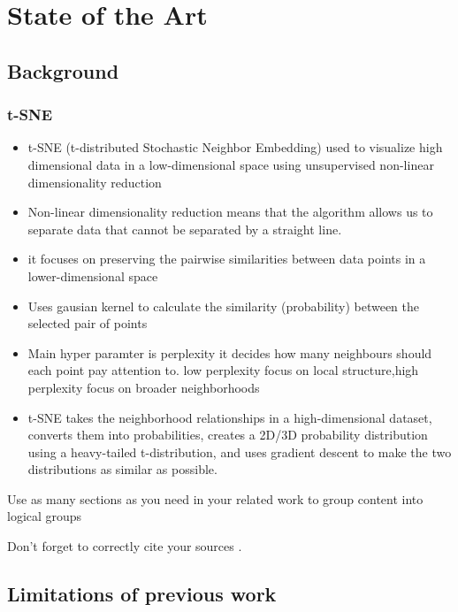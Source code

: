 \documentclass[report.tex]{subfiles}
\begin{document}
    \chapter{State of the Art}

    \section{Background}
    \subsection{t-SNE}
    \begin{itemize}
        \item t-SNE (t-distributed Stochastic Neighbor Embedding) used to visualize high dimensional data in a low-dimensional space using unsupervised non-linear dimensionality reduction
        \item Non-linear dimensionality reduction means that the algorithm allows us to separate data that cannot be separated by a straight line.
        \item it focuses on preserving the pairwise similarities between data points in a lower-dimensional space
        \item Uses gausian kernel to calculate the similarity (probability) between the selected pair of points
        \item Main hyper paramter is perplexity it decides how many neighbours should each point pay attention to. low perplexity focus on local structure,high perplexity focus on broader neighborhoods
        \item t-SNE takes the neighborhood relationships in a high-dimensional dataset, converts them into probabilities, creates a 2D/3D probability distribution using a heavy-tailed t-distribution, and uses gradient descent to make the two distributions as similar as possible.
    \end{itemize}
    Use as many sections as you need in your related work to group content into logical groups

    Don't forget to correctly cite your sources \cite{art1}.
    \section{Limitations of previous work}
\end{document}
